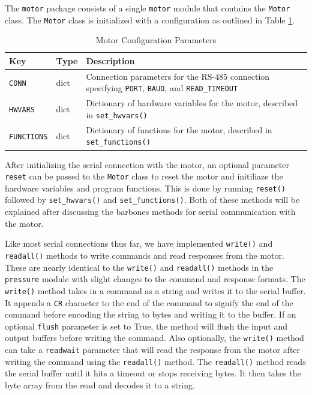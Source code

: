 The \texttt{motor} package consists of a single \texttt{motor} module that contains the \texttt{Motor} class.
The \texttt{Motor} class is initialized with a configuration as outlined in Table \ref{chap2/table:motor_config}.

\begin{table}
    \centering
    \begin{tabularx}{\textwidth}{l|l|X}
        \textbf{Key} & \textbf{Type} & \textbf{Description} \\ \hline    
        \texttt{CONN} & dict & Connection parameters for the RS-485 connection specifying \texttt{PORT}, \texttt{BAUD}, and \texttt{READ\_TIMEOUT} \\
        \texttt{HWVARS} & dict & Dictionary of hardware variables for the motor, described in \texttt{set\_hwvars()}\\
        \texttt{FUNCTIONS} & dict & Dictionary of functions for the motor, described in \texttt{set\_functions()}\\
    \end{tabularx}
    \label{chap2/table:motor_config}
    \caption{Motor Configuration Parameters}
\end{table}

After initializing the serial connection with the motor, an optional parameter \texttt{reset} can be passed to the \texttt{Motor} class to reset the motor and initiliaze the hardware variables and program functions.
This is done by running \texttt{reset()} followed by \texttt{set\_hwvars()} and \texttt{set\_functions()}.
Both of these methods will be explained after discussing the barbones methods for serial communication with the motor.

Like most serial connections thus far, we have implemented \texttt{write()} and \texttt{readall()} methods to write commands and read responses from the motor.
These are nearly identical to the \texttt{write()} and \texttt{readall()} methods in the \texttt{pressure} module with slight changes to the command and response formats.
The \texttt{write()} method takes in a command as a string and writes it to the serial buffer.
It appends a \texttt{CR} character to the end of the command to signify the end of the command before encoding the string to bytes and writing it to the buffer.
If an optional \texttt{flush} parameter is set to True, the method will flush the input and output buffers before writing the command.
Also optionally, the \texttt{write()} method can take a \texttt{readwait} parameter that will read the response from the motor after writing the command using the \texttt{readall()} method.
The \texttt{readall()} method reads the serial buffer until it hits a timeout or stops receiving bytes.
It then takes the byte array from the read and decodes it to a string.

